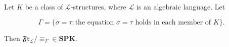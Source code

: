 Let $K$ be a class of $\mathcal{L}$-structures, where $\mathcal{L}$ is an algebraic language. Let

$$\Gamma = \{\sigma = \tau : \text{the equation } \sigma = \tau \text{ holds in each member of } K\}.$$

Then $\mathfrak{Fr}_\mathcal{L} / \equiv_\Gamma \in \mathbf{SPK}$.
